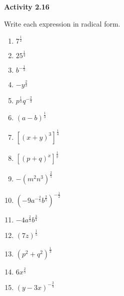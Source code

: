 \vspace{1ex}
\noindent\textbf{Activity 2.16}

\vspace{0.75ex}

 Write each expression in radical form.

\begin{multicols}{3}
\begin{enumerate}[noitemsep, label = \color{blue}\arabic*. ]
    \item $7^{\tfrac{1}{2}}$
    \item $25^{\tfrac{1}{4}}$
    \item $b^{-\tfrac{1}{3}}$
    \item $-y^{\tfrac{2}{3}}$
    \item $p^{\tfrac{1}{3}}q^{-\tfrac{2}{3}}$
    \item $\left(a-b \right)^{\tfrac{1}{3}}$
    \item $\left[(x+y)^{3}\right]^{\tfrac{1}{4}}$
    \item $\left[(p+q)^{x}\right]^{\tfrac{1}{y}}$
    \item $-\left( m^{2}n^{3} \right)^{\tfrac{2}{5}}$
    \item $\left( -9 a^{-\tfrac{2}{5}}b^{\tfrac{3}{5}} \right)^{-\tfrac{1}{2}}$
    \item $-4 a^{\tfrac{2}{3}}b^{\tfrac{3}{4}}$
    \item $\left( 7z \right)^{\tfrac{1}{5}}$
    \item $\left( p^{2}+ q^{2} \right)^{\tfrac{1}{3}}$
    \item $6 x^{\tfrac{2}{5}}$
    \item $\left( y-3x \right)^{-\tfrac{3}{4}}$
\end{enumerate}
\end{multicols}


